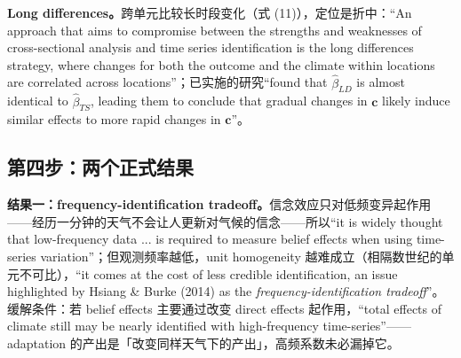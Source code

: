 \textbf{Long differences。}跨单元比较长时段变化（式 (11)），定位是折中：``An approach that aims to compromise between the strengths and weaknesses of cross-sectional analysis and time series identification is the long differences strategy, where changes for both the outcome and the climate within locations are correlated across locations''\citep[第~7 页]{hsiang2016climate}；已实施的研究``found that $\hat\beta_{LD}$ is almost identical to $\hat\beta_{TS}$, leading them to conclude that gradual changes in $\mathbf{c}$ likely induce similar effects to more rapid changes in $\mathbf{c}$''\citep[第~8 页，指 Dell et al. 2012、Burke \& Emerick、Lobell \& Asner 2003、Burke et al. 2015b 等的应用]{hsiang2016climate}。

\subsection{第四步：两个正式结果}

\textbf{结果一：frequency-identification tradeoff。}信念效应只对低频变异起作用——经历一分钟的天气不会让人更新对气候的信念——所以``it is widely thought that low-frequency data ... is required to measure belief effects when using time-series variation''\citep[第~8 页]{hsiang2016climate}；但观测频率越低，unit homogeneity 越难成立（相隔数世纪的单元不可比），``it comes at the cost of less credible identification, an issue highlighted by Hsiang \& Burke (2014) as the \emph{frequency-identification tradeoff}''\citep[第~8--9 页]{hsiang2016climate}。缓解条件：若 belief effects 主要通过改变 direct effects 起作用，``total effects of climate still may be nearly identified with high-frequency time-series''\citep[第~9 页]{hsiang2016climate}——adaptation 的产出是「改变同样天气下的产出」，高频系数未必漏掉它。


